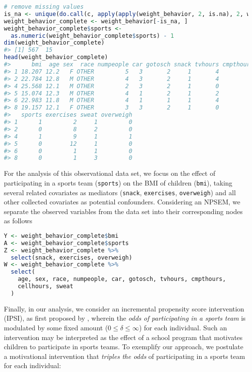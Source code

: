 \documentclass[
  12pt,
]{book}
\newcommand{\passthrough}[1]{#1}
\theoremstyle{definition}
\theoremstyle{definition}
\theoremstyle{definition}
\newcommand{\1}{\mathbbm{1}}
\begin{document}
\begin{lstlisting}[language=R]
# remove missing values
is_na <- unique(do.call(c, apply(apply(weight_behavior, 2, is.na), 2, which)))
weight_behavior_complete <- weight_behavior[-is_na, ]
weight_behavior_complete$sports <-
  as.numeric(weight_behavior_complete$sports) - 1
dim(weight_behavior_complete)
#> [1] 567  15
head(weight_behavior_complete)
#>      bmi  age sex  race numpeople car gotosch snack tvhours cmpthours cellhours
#> 1 18.207 12.2   F OTHER         5   3       2     1       4         0         0
#> 2 22.784 12.8   M OTHER         4   3       2     1       4         2         0
#> 4 25.568 12.1   M OTHER         2   3       2     1       0         2         0
#> 5 15.074 12.3   M OTHER         4   1       2     1       2         1         3
#> 6 22.983 11.8   M OTHER         4   1       1     1       4         3         2
#> 8 19.157 12.1   F OTHER         3   3       2     1       0         0         1
#>   sports exercises sweat overweigh
#> 1      1         2     1         0
#> 2      0         8     2         0
#> 4      1         9     1         1
#> 5      0        12     1         0
#> 6      0         1     1         0
#> 8      0         1     3         0
\end{lstlisting}

For the analysis of this observational data set, we focus on the effect of
participating in a sports team (\passthrough{\lstinline!sports!}) on the BMI of children (\passthrough{\lstinline!bmi!}), taking
several related covariates as mediators (\passthrough{\lstinline!snack!}, \passthrough{\lstinline!exercises!}, \passthrough{\lstinline!overweigh!}) and
all other collected covariates as potential confounders. Considering an NPSEM,
we separate the observed variables from the data set into their corresponding
nodes as follows

\begin{lstlisting}[language=R]
Y <- weight_behavior_complete$bmi
A <- weight_behavior_complete$sports
Z <- weight_behavior_complete %>%
  select(snack, exercises, overweigh)
W <- weight_behavior_complete %>%
  select(
    age, sex, race, numpeople, car, gotosch, tvhours, cmpthours,
    cellhours, sweat
  )
\end{lstlisting}

Finally, in our analysis, we consider an incremental propensity score
intervention (IPSI), as first proposed by \citet{kennedy2017nonparametric}, wherein the
\emph{odds of participating in a sports team} is modulated by some fixed amount
(\(0 \leq \delta \leq \infty\)) for each individual. Such an intervention may be
interpreted as the effect of a school program that motivates children to
participate in sports teams. To exemplify our approach, we postulate a
motivational intervention that \emph{triples the odds} of participating in a sports
team for each individual:
\end{document}
